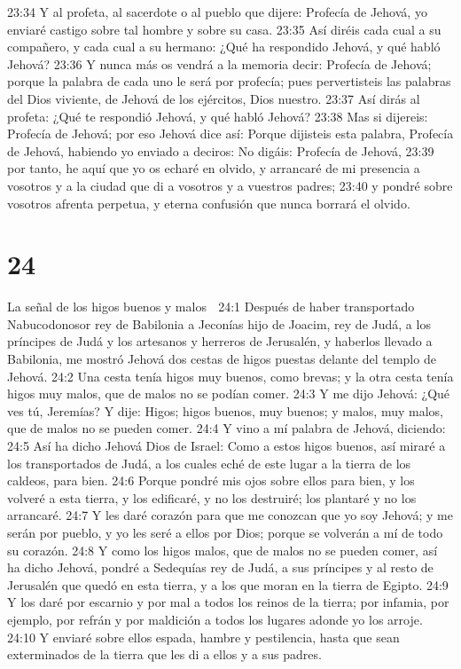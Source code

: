 23:34 Y al profeta, al sacerdote o al pueblo que dijere: Profecía de Jehová, yo enviaré castigo sobre tal hombre y sobre su casa.  
23:35 Así diréis cada cual a su compañero, y cada cual a su hermano: ¿Qué ha respondido Jehová, y qué habló Jehová?  
23:36 Y nunca más os vendrá a la memoria decir: Profecía de Jehová; porque la palabra de cada uno le será por profecía; pues pervertisteis las palabras del Dios viviente, de Jehová de los ejércitos, Dios nuestro.  
23:37 Así dirás al profeta: ¿Qué te respondió Jehová, y qué habló Jehová?  
23:38 Mas si dijereis: Profecía de Jehová; por eso Jehová dice así: Porque dijisteis esta palabra, Profecía de Jehová, habiendo yo enviado a deciros: No digáis: Profecía de Jehová,  
23:39 por tanto, he aquí que yo os echaré en olvido, y arrancaré de mi presencia a vosotros y a la ciudad que di a vosotros y a vuestros padres;  
23:40 y pondré sobre vosotros afrenta perpetua, y eterna confusión que nunca borrará el olvido.  

\chapter{24}

La señal de los higos buenos y malos  

24:1 Después de haber transportado Nabucodonosor rey de Babilonia a Jeconías hijo de Joacim, rey de Judá, a los príncipes de Judá y los artesanos y herreros de Jerusalén, y haberlos llevado a Babilonia, me mostró Jehová dos cestas de higos puestas delante del templo de Jehová.  
24:2 Una cesta tenía higos muy buenos, como brevas; y la otra cesta tenía higos muy malos, que de malos no se podían comer.  
24:3 Y me dijo Jehová: ¿Qué ves tú, Jeremías? Y dije: Higos; higos buenos, muy buenos; y malos, muy malos, que de malos no se pueden comer.  
24:4 Y vino a mí palabra de Jehová, diciendo:  
24:5 Así ha dicho Jehová Dios de Israel: Como a estos higos buenos, así miraré a los transportados de Judá, a los cuales eché de este lugar a la tierra de los caldeos, para bien.  
24:6 Porque pondré mis ojos sobre ellos para bien, y los volveré a esta tierra, y los edificaré, y no los destruiré; los plantaré y no los arrancaré.  
24:7 Y les daré corazón para que me conozcan que yo soy Jehová; y me serán por pueblo, y yo les seré a ellos por Dios; porque se volverán a mí de todo su corazón.  
24:8 Y como los higos malos, que de malos no se pueden comer, así ha dicho Jehová, pondré a Sedequías rey de Judá, a sus príncipes y al resto de Jerusalén que quedó en esta tierra, y a los que moran en la tierra de Egipto.  
24:9 Y los daré por escarnio y por mal a todos los reinos de la tierra; por infamia, por ejemplo, por refrán y por maldición a todos los lugares adonde yo los arroje. 
24:10 Y enviaré sobre ellos espada, hambre y pestilencia, hasta que sean exterminados de la tierra que les di a ellos y a sus padres.  

